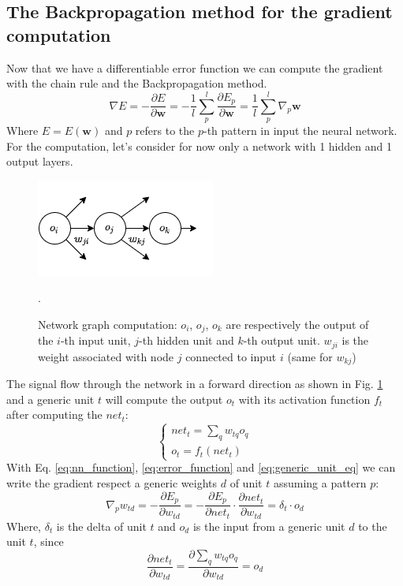 \documentclass[11pt]{article}
\begin{document}
\subsection{The Backpropagation method for the gradient computation}
Now that we have a differentiable error function we can compute the gradient with the chain rule and the Backpropagation method.
$$\nabla E = - \frac{\partial E}{\partial \mathbf{w}} = - \frac{1}{l}\sum_{p}^l \frac{\partial E_p}{\partial \mathbf{w}} = \frac{1}{l} \sum_{p}^l \nabla_{p}\mathbf{w}$$
Where $ E = E(\mathbf{w})$ and $p$ refers to the $p$-th pattern in input the neural network. For the computation, let's consider for now only a network with 1 hidden and 1 output layers. 
\begin{figure}[H]
    \centering
    \includegraphics[scale = 0.6]{Images/flow_g.png}
    \caption{Network graph computation: $o_i$, $o_j$, $o_k$ are respectively the output of the  $i$-th input unit, $j$-th hidden unit and  $k$-th output unit. $w_{ji}$ is the weight associated with node $j$ connected to input $i$ (same for $w_{kj}$)}.
    \label{fig:computation_graph_backProp}
\end{figure}
\noindent The signal flow through the network in a forward direction as shown in Fig. \ref{fig:computation_graph_backProp} and a generic unit $t$ will compute the output $o_t$ with its activation function $f_t$ after computing the $net_t$:
\begin{equation}
\label{eq:generic_unit_eq}
    \left\{
        \begin{array}{ll}
            net_t = \sum_{q} w_{tq}o_q\\
            o_t = f_t(net_t)
        \end{array}
    \right.
\end{equation}
With Eq. \ref{eq:nn_function}, \ref{eq:error_function} and \ref{eq:generic_unit_eq} we can write the gradient respect a generic weights $d$ of unit $t$ assuming a pattern $p$:
$$\nabla_{p} w_{td} = - \frac{\partial E_{p}}{\partial w_{td}} = - \frac{\partial E_{p}}{\partial net_t} \cdot \frac{\partial net_t}{\partial w_{td}} = \delta_{t} \cdot o_d$$
Where, $\delta_t$ is the delta of unit $t$ and $o_d$ is the  input from a generic unit $d$ to the unit $t$, since
\[
 \frac{\partial net_t}{\partial w_{td}} = \frac{\partial \sum_{q} w_{tq}o_q}{\partial w_{td}} = o_d
\]
\end{document}
